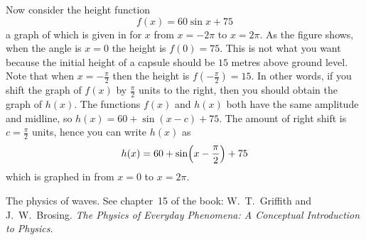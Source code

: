 \documentclass[a4paper,oneside,12pt]{article}
\begin{document}
\begin{problem}
{\begin{solution}
Now consider the height function
\begin{equation}
\label{eqn:trigonometric:london_eye_f(x)}
f(x)
=
60 \sin x + 75
\end{equation}
a graph of which is given in
 for $x$ from $x = -2\pi$ to
$x = 2\pi$.  As the figure shows, when the angle is $x = 0$ the height
is $f(0) = 75$.  This is not what you want because the initial height
of a capsule should be $15$ metres above ground level.  Note that when
$x = -\frac{\pi}{2}$ then the height is $f(-\frac{\pi}{2}) = 15$.  In
other words, if you shift the graph of $f(x)$ by $\frac{\pi}{2}$ units
to the right, then you should obtain the graph of $h(x)$.  The
functions $f(x)$ and $h(x)$ both have the same amplitude and midline,
so $h(x) = 60 + \sin(x - c) + 75$.  The amount of right shift is
$c = \frac{\pi}{2}$ units, hence you can write $h(x)$ as
\begin{equation}
\label{eqn:trigonometric:london_eye_height}
h(x)
=
60 + \sinp{x - \frac{\pi}{2}} + 75
\end{equation}
which is graphed in  from
$x = 0$ to $x = 2\pi$.
\end{solution}
}{}

\item The physics of waves.  See chapter~15 of the book:
  W.~T.~Griffith and J.~W.~Brosing.  \emph{The Physics of Everyday
    Phenomena: A Conceptual Introduction to Physics}.


\end{problem}
\end{document}
